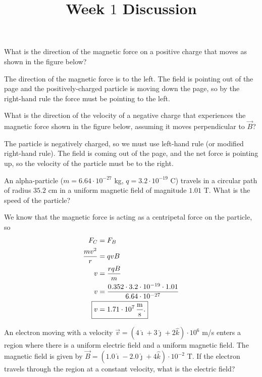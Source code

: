 \documentclass{article}
\title{Week $1$ Discussion}
\begin{document}
  \maketitle
  \newpage
  \begin{problem}{1}
    What is the direction of the magnetic force on a positive charge that moves as shown in the figure below?
  \end{problem}
  The direction of the magnetic force is to the left. The field is pointing out of the page and the positively-charged particle is moving down the page, so by the right-hand rule the force must be pointing to the left.
  \newpage
  \begin{problem}{2}
    What is the direction of the velocity of a negative charge that experiences the magnetic force shown in the figure below, assuming it moves perpendicular to $\vec{B}$?
  \end{problem}
  The particle is negatively charged, so we must use left-hand rule (or modified right-hand rule). The field is coming out of the page, and the net force is pointing up, so the velocity of the particle must be to the right.
  \newpage
  \begin{problem}{3}
    An alpha-particle ($m = 6.64\cdot 10^{-27}$ kg, $q = 3.2\cdot 10^{-19}$ C) travels in a circular path of radius $35.2$ cm in a uniform magnetic field of magnitude $1.01$ T. What is the speed of the particle?
  \end{problem}
  We know that the magnetic force is acting as a centripetal force on the particle, so 
  \begin{align*}
    F_C &= F_B \\
    \frac{mv^2}{r} &= qvB \\
    v &= \frac{rqB}{m} \\
    v &= \frac{0.352\cdot 3.2\cdot 10^{-19}\cdot 1.01}{6.64\cdot 10^{-27}} \\
    \Aboxed{v &= 1.71\cdot 10^7 \,\frac{\mathrm{m}}{\mathrm{s}}.}
  \end{align*}
  \newpage
  \begin{problem}{4}
    An electron moving with a velocity $\vec{v} = (4\hat{\imath}+3\hat{\jmath}+2\hat{k})\cdot 10^6$ m/s enters a region where there is a uniform electric field and a uniform magnetic field. The magnetic field is given by $\vec{B} = (1.0\hat{\imath}-2.0\hat{\jmath}+4\hat{k})\cdot 10^{-2}$ T. If the electron travels through the region at a constant velocity, what is the electric field?
  \end{problem}
\end{document}
